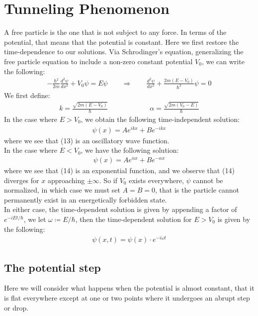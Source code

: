 \documentclass[11pt]{article}
\theoremstyle{break}
\theoremstyle{break}
\begin{document}
\section{Tunneling Phenomenon}
A free particle is the one that is not subject to any force. In terms of the potential, that means that the potential is constant. Here we first restore the time-dependence to our solutions. Via Schrodinger's equation, generalizing the free particle equation to include a non-zero constant potential $V_0$, we can write the following:
\begin{align*}
-\frac{\hbar^2}{2m} \frac{d^2 \psi}{dx^2} + V_0 \psi = E\psi \qquad \Rightarrow \qquad \frac{d^2 \psi}{dx^2} + \frac{2m(E- V_0)}{\hbar^2} \psi = 0
\end{align*}
We first define:
\begin{align*}
k = \frac{\sqrt{2m (E-V_0)}}{\hbar} \qquad\qquad\qquad \alpha = \frac{\sqrt{2m(V_0 - E)}}{\hbar}
\end{align*}
In the case where $E>V_0$, we obtain the following time-independent solution:
\begin{align}
\psi(x) = Ae^{ikx} + Be^{-ikx}
\end{align}
where we see that (13) is an oscillatory wave function. \\
In the case where $E<V_0$, we have the following solution:
\begin{align}
\psi(x) = Ae^{\alpha x} + Be^{-\alpha x}
\end{align}
where we see that (14) is an exponential function, and we observe that (14) diverges for $x$ approaching $\pm \infty$. So if $V_0$ exists everywhere, $\psi$ cannot be normalized, in which case we must set $A = B = 0$, that is the particle cannot permanently exist in an energetically forbidden state. \\

In either case, the time-dependent solution is given by appending a factor of $e^{-iEt/\hbar}$, we let $\omega \coloneqq E/\hbar$, then the time-dependent solution for $E>V_0$ is given by the following:
\begin{align*}
\psi(x,t) = \psi(x) \cdot e^{-i \omega t}
\end{align*}

\subsection{The potential step}
Here we will consider what happens when the potential is almost constant, that it is flat everywhere except at one or two points where it undergoes an abrupt step or drop.\\
\end{document}
